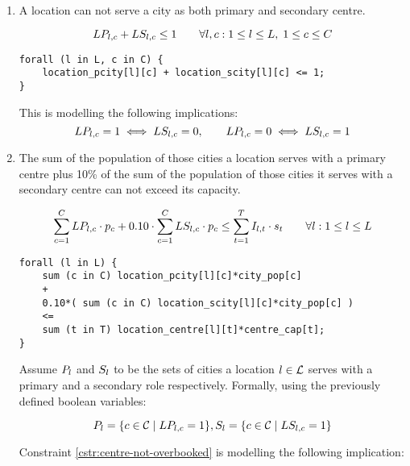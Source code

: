 \begin{enumerate}
    \item A location can not serve a city as both primary and secondary centre.
    
    \begin{equation}
    LP_{l, c} + LS_{l, c} \le 1
    \qquad \forall l, c:
    1 \le l \le L,\;
    1 \le c \le C
    \label{cstr:centre-not-too-busy}
    \end{equation}
    
\begin{lstlisting}
forall (l in L, c in C) {
	location_pcity[l][c] + location_scity[l][c] <= 1;
}
\end{lstlisting}
    
    This is modelling the following implications:
    \[
    LP_{l, c} = 1 \iff LS_{l, c} = 0, \qquad
    LP_{l, c} = 0 \iff LS_{l, c} = 1
    \]
    
    \item The sum of the population of those cities a location serves with a primary centre
    plus 10\% of the sum of the population of those cities it serves with a secondary centre
    can not exceed its capacity.
    
    \begin{equation}
    \sum_{c = 1}^{C} LP_{l, c} \cdot p_{c} +
    0.10 \cdot \sum_{c = 1}^{C} LS_{l, c} \cdot p_{c}
    \le
    \sum_{t = 1}^{T} I_{l, t} \cdot s_{t}
    \qquad \forall l: 1 \le l \le L
    \label{cstr:centre-not-overbooked}
    \end{equation}
    
\begin{lstlisting}
forall (l in L) {
	sum (c in C) location_pcity[l][c]*city_pop[c]
	+
	0.10*( sum (c in C) location_scity[l][c]*city_pop[c] )
	<=
	sum (t in T) location_centre[l][t]*centre_cap[t];
}
\end{lstlisting}
    
    Assume $P_{l}$ and $S_{l}$ to be
    the sets of cities a location $l \in \mathcal{L}$ serves with a primary and a secondary
    role respectively. Formally, using the previously defined boolean variables:
    
    \[
    P_{l} = \{c \in \mathcal{C} \;|\; LP_{l, c} = 1 \},
    S_{l} = \{c \in \mathcal{C} \;|\; LS_{l, c} = 1 \}
    \]
    
    Constraint \ref{cstr:centre-not-overbooked} is modelling the following implication:
    

\end{enumerate}
